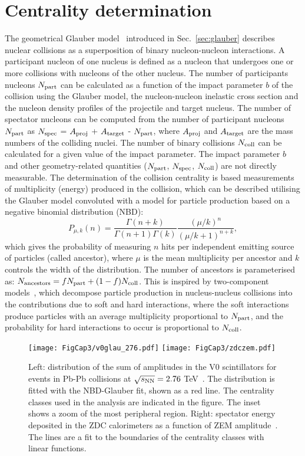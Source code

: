 \section{Centrality determination}
\label{sec:centr}
The geometrical Glauber model~\cite{Miller:2007ri} introduced in Sec.~\ref{sec:glauber} describes
nuclear collisions as a superposition of binary nucleon-nucleon interactions. 
A participant nucleon of one nucleus is defined as a nucleon that undergoes one or more 
 collisions with nucleons of the other nucleus. The number of participants nucleons $N_{\rm part}$
 can be calculated as a function of the impact parameter $b$ of the collision using the Glauber
 model, the nucleon-nucleon inelastic cross section and the nucleon density profiles of the projectile and target
 nucleus. The number of spectator nucleons can be computed from the number of participant nucleons 
$N_{\rm part}$ as $N_{\rm spec}$ = $A_{\rm proj}$ + $A_{\rm target}$ - $N_{\rm part}$, where $A_{\rm proj}$ and $A_{\rm target}$
are the mass numbers of the colliding nuclei. The number of binary 
collisions $N_{\rm coll}$ can be calculated for a given value of the impact parameter. 
The impact parameter $b$ and other geometry-related quantities ($N_{\rm part}$, 
$N_{\rm spec}$, $N_{\rm coll}$) are not directly measurable. The determination of the collision centrality is based 
measurements of multiplicity (energy) produced in the collision, which can be described utilising
the Glauber model convoluted with a model for particle production based on a negative binomial distribution (NBD):
\begin{equation}
\label{eq:NBD}
P_{\mu, k} (n) = \frac{\Gamma(n+k)}{\Gamma(n+1)\Gamma(k)}\frac{(\mu/k)^n}{(\mu/k+1)^{n+k}},
\end{equation}
which gives the probability of measuring $n$ hits per independent emitting source of particles (called ancestor),
 where $\mu$ is the mean multiplicity per ancestor and $k$ controls the width of the distribution. 
The number of ancestors is parameterised as: $N_{\rm ancestors} = fN_{\rm part} + (1- f) N_{\rm coll}$.
This is inspired by two-component models~\cite{Deng:2010mv,Kharzeev:2004if}, which decompose particle production in nucleus-nucleus 
collisions into the contributions due to soft and hard interactions, where the soft interactions produce particles with 
an average multiplicity proportional to $N_{\rm part}$, and the probability for hard interactions to occur is proportional to $N_{\rm coll}$. 
\begin{figure}[!h]
\centering
\texttt{[image: FigCap3/v0glau\_276.pdf]}
\texttt{[image: FigCap3/zdczem.pdf]}
\caption{Left: distribution of the sum of amplitudes in the V0 scintillators for events in Pb-Pb collisions at $\sqrt{s_{\rm NN}}=2.76$ TeV~\cite{Abelev:2013qoq}. The distribution is fitted with the NBD-Glauber fit, shown as a red line. The centrality classes used in the analysis are indicated in the figure. The inset shows a zoom of the most peripheral region. Right: spectator energy deposited in the ZDC calorimeters as a function of ZEM amplitude~\cite{Abelev:2013qoq}. The lines are a fit to the boundaries of the centrality classes with linear functions.}
\label{fig:centrality}
\end{figure}
